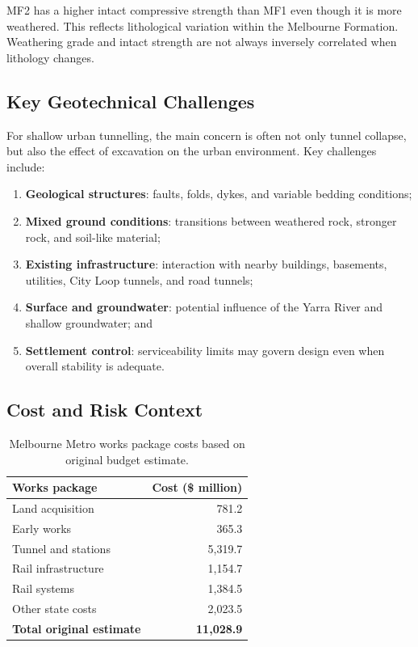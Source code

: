 \documentclass[a4paper,12pt]{article}
\begin{document}
\begin{notebox}
MF2 has a higher intact compressive strength than MF1 even though it is more weathered. This reflects lithological variation within the Melbourne Formation. Weathering grade and intact strength are not always inversely correlated when lithology changes.
\end{notebox}

\subsection{Key Geotechnical Challenges}
For shallow urban tunnelling, the main concern is often not only tunnel collapse, but also the effect of excavation on the urban environment. Key challenges include:
\begin{enumerate}
    \item \textbf{Geological structures}: faults, folds, dykes, and variable bedding conditions;
    \item \textbf{Mixed ground conditions}: transitions between weathered rock, stronger rock, and soil-like material;
    \item \textbf{Existing infrastructure}: interaction with nearby buildings, basements, utilities, City Loop tunnels, and road tunnels;
    \item \textbf{Surface and groundwater}: potential influence of the Yarra River and shallow groundwater; and
    \item \textbf{Settlement control}: serviceability limits may govern design even when overall stability is adequate.
\end{enumerate}

\subsection{Cost and Risk Context}

\begin{table}[H]
\centering
\small
\begin{tabularx}{0.8\textwidth}{X r}
\toprule
\textbf{Works package} & \textbf{Cost (\$ million)} \\
\midrule
Land acquisition & 781.2 \\
Early works & 365.3 \\
Tunnel and stations & 5,319.7 \\
Rail infrastructure & 1,154.7 \\
Rail systems & 1,384.5 \\
Other state costs & 2,023.5 \\
\midrule
\textbf{Total original estimate} & \textbf{11,028.9} \\
\bottomrule
\end{tabularx}
\caption{Melbourne Metro works package costs based on original budget estimate.}
\end{table}
\end{document}
